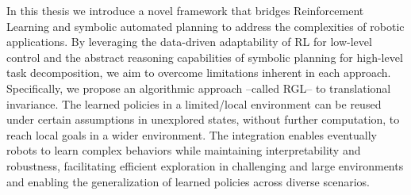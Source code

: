 In this thesis we introduce a novel framework that bridges Reinforcement Learning and symbolic automated planning to 
address the complexities of robotic applications. 
By leveraging the data-driven adaptability of RL for low-level control and the abstract reasoning capabilities of 
symbolic planning for high-level task decomposition, we aim to overcome limitations inherent in each approach. 
Specifically, we propose an algorithmic approach --called RGL-- to translational invariance. 
The learned policies in a limited/local environment can be reused under certain assumptions in unexplored states, 
without further computation, to reach local goals in a wider environment.
The integration enables eventually robots to learn complex behaviors while maintaining interpretability and 
robustness, facilitating efficient exploration in challenging and large environments and enabling the generalization 
of learned policies across diverse scenarios.

